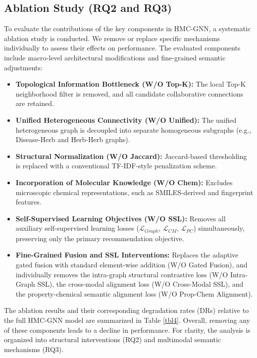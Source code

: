 \documentclass[a4paper,fleqn]{cas-dc}
\begin{document}
\subsection{Ablation Study (RQ2 and RQ3)}

To evaluate the contributions of the key components in HMC-GNN, a systematic ablation study is conducted. We remove or replace specific mechanisms individually to assess their effects on performance. The evaluated components include macro-level architectural modifications and fine-grained semantic adjustments:
\begin{itemize}
    \item \textbf{Topological Information Bottleneck (W/O Top-K):} The local Top-K neighborhood filter is removed, and all candidate collaborative connections are retained.
    \item \textbf{Unified Heterogeneous Connectivity (W/O Unified):} The unified heterogeneous graph is decoupled into separate homogeneous subgraphs (e.g., Disease-Herb and Herb-Herb graphs).
    \item \textbf{Structural Normalization (W/O Jaccard):} Jaccard-based thresholding is replaced with a conventional TF-IDF-style penalization scheme.
    \item \textbf{Incorporation of Molecular Knowledge (W/O Chem):} Excludes microscopic chemical representations, such as SMILES-derived and fingerprint features.
    \item \textbf{Self-Supervised Learning Objectives (W/O SSL):} Removes all auxiliary self-supervised learning losses ($\mathcal{L}_{Graph}$, $\mathcal{L}_{CM}$, $\mathcal{L}_{PC}$) simultaneously, preserving only the primary recommendation objective.
    \item \textbf{Fine-Grained Fusion and SSL Interventions:} Replaces the adaptive gated fusion with standard element-wise addition (W/O Gated Fusion), and individually removes the intra-graph structural contrastive loss (W/O Intra-Graph SSL), the cross-modal alignment loss (W/O Cross-Modal SSL), and the property-chemical semantic alignment loss (W/O Prop-Chem Alignment).
\end{itemize}

The ablation results and their corresponding degradation rates (DRs) relative to the full HMC-GNN model are summarized in Table \ref{tbl4}. Overall, removing any of these components leads to a decline in performance. For clarity, the analysis is organized into structural interventions (RQ2) and multimodal semantic mechanisms (RQ3).
\end{document}
